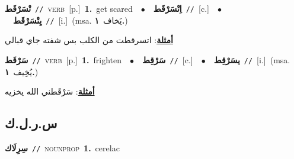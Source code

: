 \documentclass[10pt,a4paper,twoside]{article} %
\begin{document}
\begin{multicols}{2}
{\setlength\topsep{0pt}\textbf{\foreignlanguage{arabic}{تْسَرْقَط}}\ {\color{gray}\texttt{//}\color{black}}\ \textsc{verb}\ [p.]\ \textbf{1.}~get scared\ \ $\bullet$\ \ \setlength\topsep{0pt}\textbf{\foreignlanguage{arabic}{اِتْسَرْقَط}}\ {\color{gray}\texttt{//}\color{black}}\ [c.]\ \ $\bullet$\ \ \setlength\topsep{0pt}\textbf{\foreignlanguage{arabic}{يِتْسَرْقَط}}\ {\color{gray}\texttt{//}\color{black}}\ [i.]\ \color{gray}(msa. \foreignlanguage{arabic}{يَخاف}~\foreignlanguage{arabic}{\textbf{١.}})\color{black}\  \begin{flushright}\color{gray}\foreignlanguage{arabic}{\textbf{\underline{\foreignlanguage{arabic}{أمثلة}}}: اتسرقطت من الكلب بس شفته جاي قبالي}\end{flushright}\color{black}} \vspace{2mm}

{\setlength\topsep{0pt}\textbf{\foreignlanguage{arabic}{سَرْقَط}}\ {\color{gray}\texttt{//}\color{black}}\ \textsc{verb}\ [p.]\ \textbf{1.}~frighten\ \ $\bullet$\ \ \setlength\topsep{0pt}\textbf{\foreignlanguage{arabic}{سَرْقِط}}\ {\color{gray}\texttt{//}\color{black}}\ [c.]\ \ $\bullet$\ \ \setlength\topsep{0pt}\textbf{\foreignlanguage{arabic}{يسَرْقِط}}\ {\color{gray}\texttt{//}\color{black}}\ [i.]\ \color{gray}(msa. \foreignlanguage{arabic}{يُخِيف}~\foreignlanguage{arabic}{\textbf{١.}})\color{black}\  \begin{flushright}\color{gray}\foreignlanguage{arabic}{\textbf{\underline{\foreignlanguage{arabic}{أمثلة}}}: سَرْقَطني الله يخزيه}\end{flushright}\color{black}} \vspace{2mm}

\vspace{-3mm}
\subsection*{\color{blue}\foreignlanguage{arabic}{س.ر.ل.ك}\color{blue}{ (ntws)}} 

{\setlength\topsep{0pt}\textbf{\foreignlanguage{arabic}{سِرِلَاك}}\ {\color{gray}\texttt{//}\color{black}}\ \textsc{noun\textunderscore prop}\ \textbf{1.}~cerelac\ } \vspace{2mm}


\end{multicols}
\end{document}
